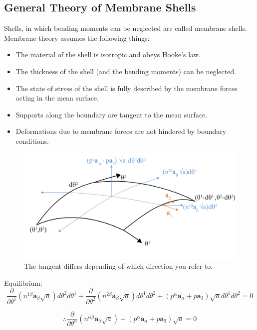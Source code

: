 \subsection{General Theory of Membrane Shells}


Shells, in which bending moments can be neglected are called membrane
shells. Membrane theory assumes the following things:

\begin{itemize}
\item The material of the shell is isotropic and obeys Hooke's law.
\item The thickness of the shell (and the bending moments) can be neglected.
\item The state of stress of the shell is fully described by the membrane
forces acting in the mean surface.
\item Supports along the boundary are tangent to the mean surface.
\item Deformations due to membrane forces are not hindered by boundary
conditions.
\end{itemize}

\begin{figure}[H]
\centering
\includegraphics[width=0.9\linewidth ]{figure/Theory/membraneDefinition.pdf}
\caption{The tangent differs depending of which direction you refer to. }
\end{figure}


Equilibrium: 
\begin{equation}
\frac{\partial}{\partial \theta^1}(n^{1 \beta}\textbf{a}_{\beta} \sqrt{a}) d\theta^2 d\theta^1 + \frac{\partial}{\partial \theta^2}(n^{2 \beta}\textbf{a}_{\beta} \sqrt{a}) d\theta^1 d\theta^2 + ( p^{\alpha}\textbf{a}_\alpha + p\textbf{a}_3)\sqrt{a} d\theta^1 d\theta^2  = 0
\end{equation}



\begin{equation} \label{membraneEq}
\therefore  \frac{\partial}{\partial \theta^ \alpha} (n^{\alpha \beta} \textbf{a}_\beta \sqrt{ a}) + ( p^{\alpha}\textbf{a}_\alpha + p\textbf{a}_3)\sqrt{a} = 0
\end{equation}

